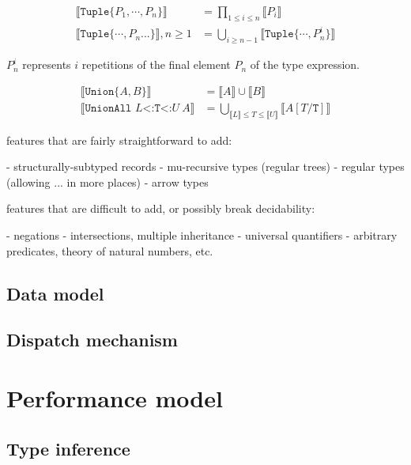 \begin{align*}
  \llbracket \texttt{Tuple\{}P_1,\cdots,P_n\texttt{\}} \rrbracket &= \prod_{1\leq i \leq n} \llbracket P_i \rrbracket \\
  \llbracket \texttt{Tuple\{}\cdots,P_n\texttt{...\}} \rrbracket, n\geq 1 &= \bigcup_{i\geq n-1} \llbracket \texttt{Tuple\{}\cdots,P_n^i\texttt{\}} \rrbracket
\end{align*}

$P_n^i$ represents $i$ repetitions of the final element $P_n$ of the type expression.

\begin{align*}
  \llbracket \texttt{Union\{}A,B\texttt{\}} \rrbracket &= \llbracket A \rrbracket \cup \llbracket B \rrbracket \\
  \llbracket \texttt{UnionAll }L\texttt{<:T<:}U\ A \rrbracket &= \bigcup_{\llbracket L \rrbracket \leq T \leq \llbracket U \rrbracket} \llbracket A[T/\texttt{T}] \rrbracket
\end{align*}

features that are fairly straightforward to add:

- structurally-subtyped records
- mu-recursive types (regular trees)
- regular types (allowing ... in more places)
- arrow types

features that are difficult to add, or possibly break decidability:

- negations
- intersections, multiple inheritance
- universal quantifiers
- arbitrary predicates, theory of natural numbers, etc.

\subsection{Data model}

\subsection{Dispatch mechanism}

\section{Performance model}

\subsection{Type inference}

